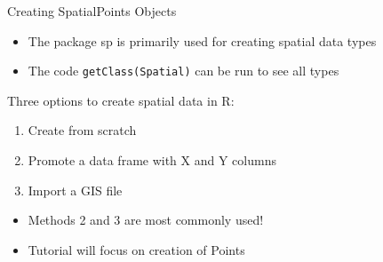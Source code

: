 \documentclass[10pt,ignorenonframetext,]{beamer}
\providecommand{\tightlist}{%
  \setlength{\itemsep}{0pt}\setlength{\parskip}{0pt}}
\def\endcol{\end{column}}
\def\endcols{\end{columns}}
\begin{document}

\begin{frame}[fragile]{Creating SpatialPoints Objects}

\begin{itemize}
\tightlist
\item
  The package \alert{sp} is primarily used for creating spatial data
  types
\item
  The code
  \texttt{getClass(\textquotesingle{}Spatial\textquotesingle{})} can be
  run to see all types
\end{itemize}

Three options to create spatial data in R:

\begin{enumerate}
\def\labelenumi{\arabic{enumi}.}
\tightlist
\item
  Create from scratch
\item
  Promote a data frame with X and Y columns
\item
  Import a GIS file
\end{enumerate}

\begin{itemize}
\tightlist
\item
  Methods 2 and 3 are most commonly used!
\item
  Tutorial will focus on creation of Points
\end{itemize}

\end{frame}
\end{document}
